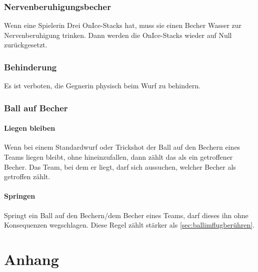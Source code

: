 \documentclass[a5paper, 12pt]{book}
\begin{document}
\section{Nervenberuhigungsbecher}\label{sec:Nervenberuhigungsbecher}
Wenn eine Spielerin Drei OnIce-Stacks hat, muss sie einen Becher Wasser zur Nervenberuhigung trinken. Dann werden die OnIce-Stacks wieder auf Null zurückgesetzt.
\section{Behinderung}\label{sec:behinderung}
Es ist verboten, die Gegnerin physisch beim Wurf zu behindern. 
\section{Ball auf Becher}\label{sec:aufbecher}
\subsection{Liegen bleiben}\label{sub:liegenbleiben}
Wenn bei einem Standardwurf oder Trickshot der Ball auf den Bechern eines Teams liegen bleibt, ohne hineinzufallen, dann zählt das als ein getroffener Becher. Das Team, bei dem er liegt, darf sich aussuchen, welcher Becher als getroffen zählt.
\subsection{Springen}\label{sub:springen}
Springt ein Ball auf den Bechern/dem Becher eines Teams, darf dieses ihn ohne Konsequenzen wegschlagen. Diese Regel zählt stärker als \ref{sec:ballimflugberühren}.
\appendix
\part {Anhang} \label{part:anhang}
\end{document}
